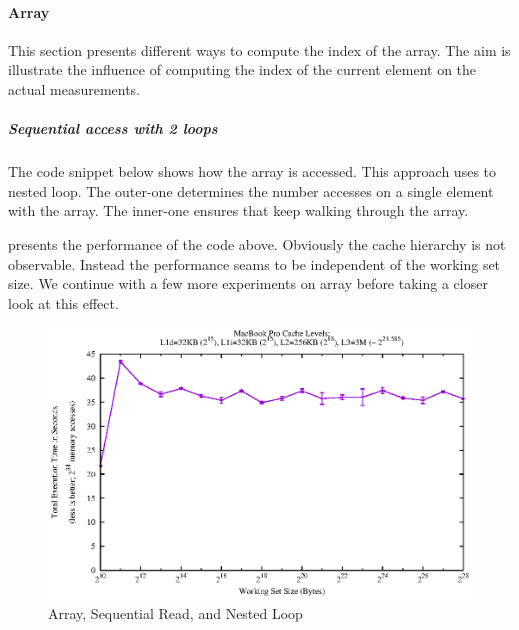 \hypertarget{array}{\paragraph{Array}\label{array}}

This section presents different ways to compute the index of the array.
The aim is illustrate the influence of computing the index of the
current element on the actual measurements.

\hypertarget{sequential-access-with-2-loops-1}{\subparagraph{Sequential
access with 2 loops}\label{sequential-access-with-2-loops-1}}

The code snippet below shows how the array is accessed. This approach
uses to nested loop. The outer-one determines the number accesses on a
single element with the array. The inner-one ensures that keep walking
through the array.

\begin{Shaded}
\begin{Highlighting}[]
  
   
  \NormalTok{(} 
    \NormalTok{(} 
      \NormalTok{(}\NormalTok{)list[j].pad[}\NormalTok{];}
   
\NormalTok{\}}
\end{Highlighting}
\end{Shaded}

 presents the performance of the code above. Obviously
the cache hierarchy is not observable. Instead the performance seams to
be independent of the working set size. We continue with a few more
experiments on array before taking a closer look at this effect.

\begin{figure}[htbp]
\centering
\includegraphics{appendix/plots-cache-measurements/plot-array-2-loops}
\caption{Array, Sequential Read, and Nested Loop}
\label{app:arr-seqread-nl}
\end{figure}

